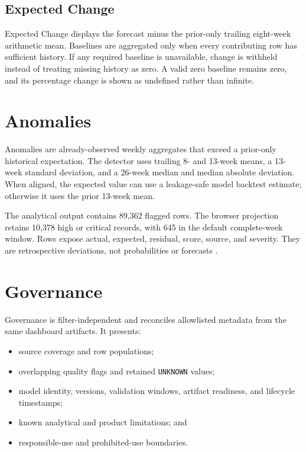 \documentclass[11pt,oneside]{report}
\begin{document}
\subsection{Expected Change}

Expected Change displays the forecast minus the prior-only trailing eight-week
arithmetic mean. Baselines are aggregated only when every contributing row has
sufficient history. If any required baseline is unavailable, change is withheld
instead of treating missing history as zero. A valid zero baseline remains zero,
and its percentage change is shown as undefined rather than infinite.

\section{Anomalies}

Anomalies are already-observed weekly aggregates that exceed a prior-only
historical expectation. The detector uses trailing 8- and 13-week means, a
13-week standard deviation, and a 26-week median and median absolute deviation.
When aligned, the expected value can use a leakage-safe model backtest estimate;
otherwise it uses the prior 13-week mean.

The analytical output contains 89,362 flagged rows. The browser projection
retains 10,378 high or critical records, with 645 in the default complete-week
window. Rows expose actual, expected, residual, score, source, and severity.
They are retrospective deviations, not probabilities or forecasts
\cite{anomalyreport}.

\section{Governance}

Governance is filter-independent and reconciles allowlisted metadata from the
same dashboard artifacts. It presents:

\begin{itemize}
  \item source coverage and row populations;
  \item overlapping quality flags and retained \texttt{UNKNOWN} values;
  \item model identity, versions, validation windows, artifact readiness, and
    lifecycle timestamps;
  \item known analytical and product limitations; and
  \item responsible-use and prohibited-use boundaries.
\end{itemize}
\end{document}
